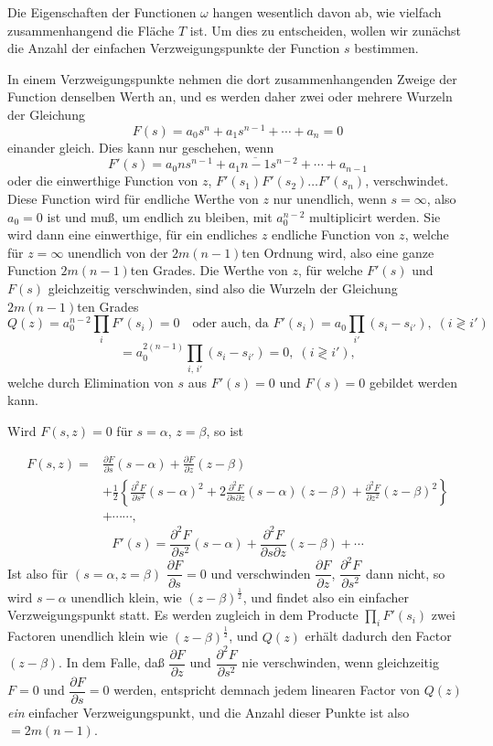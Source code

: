 \documentclass{article}
\begin{document}
Die Eigenschaften der Functionen $\omega$ hangen wesentlich davon ab, wie vielfach zusammenhangend die Fläche $T$ ist. Um dies zu entscheiden, wollen wir zunächst die Anzahl der einfachen Verzweigungspunkte der Function $s$ bestimmen.

In einem Verzweigungspunkte nehmen die dort zusammenhangenden Zweige der Function denselben Werth an, und es werden daher zwei oder mehrere Wurzeln der Gleichung
\[ F(s) = a_{0} s^{n} + a_{1} s^{n-1} + \cdots + a_{n} = 0 \]
einander gleich. Dies kann nur geschehen, wenn
\[ F'(s) = a_{0} n s^{n-1} + a_{1} \overline{n-1} s^{n-2} + \cdots + a_{n-1} \]
oder die einwerthige Function von $z$, $F'(s_{1}) F'(s_{2}) \ldots F'(s_{n})$, verschwindet. Diese Function wird für endliche Werthe von $z$ nur unendlich, wenn $s = \infty$, also $a_{0} = 0$ ist und muß, um endlich zu bleiben, mit $a_{0}^{n-2}$ multiplicirt werden. Sie wird dann eine einwerthige, für ein endliches $z$ endliche Function von $z$, welche für $z = \infty$ unendlich von der $2m(n-1)$ten Ordnung wird, also eine ganze Function $2m(n-1)$ten Grades. Die Werthe von $z$, für welche $F'(s)$ und $F(s)$ gleichzeitig verschwinden, sind also die Wurzeln der Gleichung $2m(n-1)$ten Grades
\[ Q(z) = a_{0}^{n-2} \prod_{i} F'(s_{i}) = 0 \quad \text{oder auch, da } F'(s_{i}) = a_{0} \prod_{i'}(s_{i} - s_{i'}), \; (i \gtrless i') \]
\[ = a_{0}^{2(n-1)} \prod_{i,\, i'} (s_{i} - s_{i'}) = 0, \; (i \gtrless i'), \]
welche durch Elimination von $s$ aus $F'(s) = 0$ und $F(s) = 0$ gebildet werden kann.

Wird $F(s, z) = 0$ für $s = \alpha$, $z = \beta$, so ist

\[
\begin{aligned}
F(s, z) ={}& \frac{\partial F}{\partial s}(s-\alpha) + \frac{\partial F}{\partial z}(z-\beta) \\
&+ \tfrac{1}{2}\left\{\frac{\partial^{2}F}{\partial s^{2}}(s-\alpha)^{2} + 2\frac{\partial^{2}F}{\partial s \partial z}(s-\alpha)(z-\beta) + \frac{\partial^{2}F}{\partial z^{2}}(z-\beta)^{2}\right\} \\
&+ \cdots\cdots,
\end{aligned}
\]
\[ F'(s) = \frac{\partial^{2}F}{\partial s^{2}}(s-\alpha) + \frac{\partial^{2}F}{\partial s \partial z}(z-\beta) + \cdots \]
Ist also für $(s = \alpha, z = \beta)$ $\dfrac{\partial F}{\partial s} = 0$ und verschwinden $\dfrac{\partial F}{\partial z}$, $\dfrac{\partial^{2}F}{\partial s^{2}}$ dann nicht, so wird $s-\alpha$ unendlich klein, wie $(z-\beta)^{\frac{1}{2}}$, und findet also ein einfacher Verzweigungspunkt statt. Es werden zugleich in dem Producte $\displaystyle\prod_{i} F'(s_{i})$ zwei Factoren unendlich klein wie $(z-\beta)^{\frac{1}{2}}$, und $Q(z)$ erhält dadurch den Factor $(z-\beta)$. In dem Falle, daß $\dfrac{\partial F}{\partial z}$ und $\dfrac{\partial^{2}F}{\partial s^{2}}$ nie verschwinden, wenn gleichzeitig $F = 0$ und $\dfrac{\partial F}{\partial s} = 0$ werden, entspricht demnach jedem linearen Factor von $Q(z)$ \emph{ein} einfacher Verzweigungspunkt, und die Anzahl dieser Punkte ist also $= 2m(n-1)$.
\end{document}
